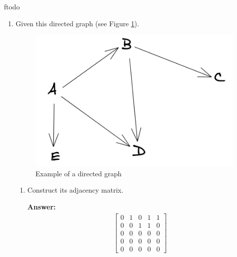 ƒtodo\documentclass{article}
\newenvironment{QandA}{\begin{enumerate}[label=\arabic*.]}{\end{enumerate}}
\newenvironment{InnerQandA}{\begin{enumerate}[label=\roman*.]}{\end{enumerate}}
\newenvironment{answer}{\par\normalfont \textbf{Answer:}}{}
\begin{document}
\begin{QandA}
\begin{InnerQandA}
        \item How are they used in deep learning?
        \begin{answer}
            While in theory there is nothing stopping you from applying bagging and boosting to deep neural networks, in practice it is almost infeasible. \\\\
            Historically, these ensembling techniques have been introduced by combining many weak (slightly above random performance), but inexpensive learners such as decision trees. \\\\
            Today, deep neural networks are so large that even a single model is distributed among many nodes for distributed training. To consider training hundreds of networks for the purposes of boosting/bagging is almost unimaginable. Even if we somehow train them, at inference time the predictions can take from seconds to several minutes, deeming them extremely impractical (e.g. self-driving cars). \\\\
            Moreover, it is known that neural networks are very sample inefficient, requiring huge datasets which can take weeks to months to train on. This means that training in an iterative manner, such as in boosting, could take months to years to finish.
        \end{answer}
    \end{InnerQandA}

    \item Given this directed graph (see Figure \ref{fig:directed-graph}).
    \begin{figure}[htb!]
        \centering
        \includegraphics[width=0.3\columnwidth]{img/directed-graph.png}
        \caption{Example of a directed graph}
        \label{fig:directed-graph}
    \end{figure}
    \begin{InnerQandA}
        \item Construct its adjacency matrix.
        \begin{answer} 
            \begin{align*}
                \begin{bmatrix}
                    0 & 1 & 0 & 1 & 1 \\
                    0 & 0 & 1 & 1 & 0 \\
                    0 & 0 & 0 & 0 & 0 \\
                    0 & 0 & 0 & 0 & 0 \\
                    0 & 0 & 0 & 0 & 0
                \end{bmatrix}
            \end{align*}
            

\end{answer}
\end{InnerQandA}
\end{QandA}
\end{document}
